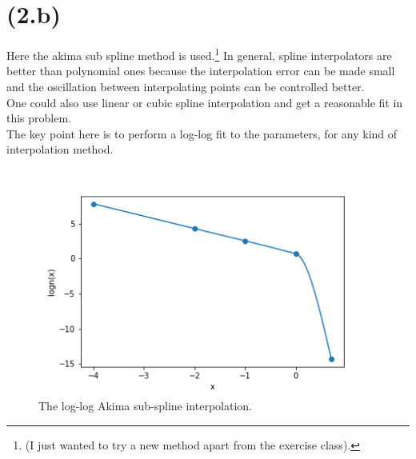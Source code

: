 \section{(2.b)}
Here the akima sub spline method is used.\footnote{ 
(I just wanted to try a new method apart from the exercise class).} In general, spline interpolators are better than polynomial ones because the interpolation error can be made small and the oscillation between interpolating points can be controlled better.\\
One could also use linear or cubic spline interpolation and get a reasonable fit in this problem.\\
The key point here is to perform a log-log fit to the parameters, for any kind of interpolation method.



\begin{figure}[!htb]
  \centering
  \includegraphics[width=0.7\linewidth]{Plots/interp_2b.png}
  \caption{The log-log Akima sub-spline interpolation.}
  \label{fig:fig3}
\end{figure}